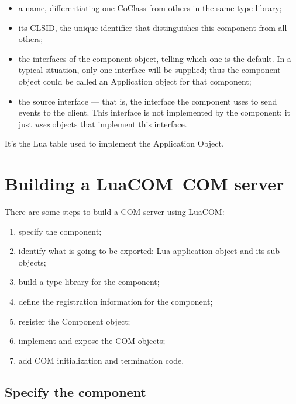 \documentclass[11pt,a4paper,english]{report}
\newcommand{\techname}[1]{\mbox{#1}}
\newcommand{\luacom}{\techname{LuaCOM}}
\begin{document}
\begin{description}
\begin{itemize}
  \item a name, differentiating one CoClass from others in the same
  type library;

  \item its CLSID, the unique identifier that distinguishes this
  component from all others;

  \item the interfaces of the component object, telling which one is
  the default. In a typical situation, only one interface will be
  supplied; thus the component object could be called an Application
  object for that component;

  \item the source interface --- that is, the interface the component
  uses to send events to the client. This interface is not implemented
  by the component: it just \emph{uses} objects that implement this
  interface.

  \end{itemize}

\item [Lua Application Object] It's the Lua table used to implement
the Application Object.

\end{description}


\section{Building a \luacom\ COM server}

There are some steps to build a COM server using \luacom:

\begin{enumerate}
\item specify the component;
\item identify what is going to be exported: Lua application object
and its sub-objects;
\item build a type library for the component;
\item define the registration information for the component;
\item register the Component object;
\item implement and expose the COM objects;
\item add COM initialization and termination code.
\end{enumerate}


\subsection{Specify the component}
\end{document}
